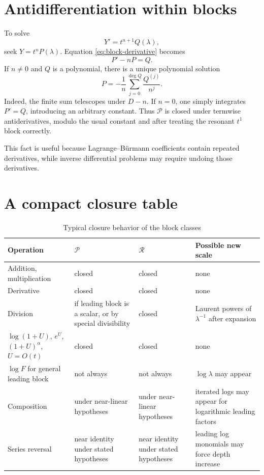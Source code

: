 \documentclass[11pt,openany]{book}
\theoremstyle{definition}
\theoremstyle{plain}
\theoremstyle{remark}
\newcommand{\Plog}{\mathscr{P}}
\newcommand{\Rlog}{\mathscr{R}}
\DeclareMathOperator{\polydeg}{deg}
\begin{document}
\section{Antidifferentiation within blocks}
To solve
\[
 Y'=t^{n+1}Q(\lambda),
\]
seek \(Y=t^nP(\lambda)\). Equation \cref{eq:block-derivative} becomes
\begin{equation}\label{eq:block-antiderivative-ode}
 P'-nP=Q.
\end{equation}
If \(n\ne0\) and \(Q\) is a polynomial, there is a unique polynomial solution
\begin{equation}\label{eq:block-antiderivative-solution}
 P=-\frac1n\sum_{j=0}^{\polydeg Q}\frac{Q^{(j)}}{n^j}.
\end{equation}
Indeed, the finite sum telescopes under \(D-n\). If \(n=0\), one simply integrates \(P'=Q\), introducing an arbitrary constant. Thus \(\Plog\) is closed under termwise antiderivatives, modulo the usual constant and after treating the resonant \(t^1\) block correctly.

This fact is useful because Lagrange--B\"urmann coefficients contain repeated derivatives, while inverse differential problems may require undoing those derivatives.

\section{A compact closure table}
\begin{table}[htbp]
\centering
\caption{Typical closure behavior of the block classes}\label{tab:closure}
\small
\begin{tabularx}{\textwidth}{@{}p{}XXX@{}}
\toprule
Operation & \(\Plog\) & \(\Rlog\) & Possible new scale\\
\midrule
Addition, multiplication & closed & closed & none\\
Derivative & closed & closed & none\\
Division & if leading block is a scalar, or by special divisibility & closed & Laurent powers of \(\lambda^{-1}\) after expansion\\
\(\log(1+U)\), \(e^U\), \((1+U)^\alpha\), \(U=O(t)\) & closed & closed & none\\
\(\log F\) for general leading block & not always & not always & \(\log\lambda\) may appear\\
Composition & under near-linear hypotheses & under near-linear hypotheses & iterated logs may appear for logarithmic leading factors\\
Series reversal & near identity under stated hypotheses & near identity under stated hypotheses & leading log monomials may force depth increase\\
\bottomrule
\end{tabularx}
\end{table}
\end{document}
